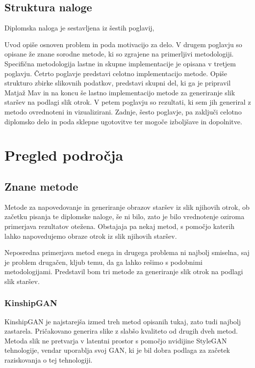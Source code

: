 \documentclass[a4paper,12pt,openright]{book}
\begin{document}
\section{Struktura naloge}
Diplomska naloga je sestavljena iz šestih poglavij,

Uvod opiše osnoven problem in poda motivacijo za delo. V drugem poglavju so opisane že znane sorodne metode, ki so zgrajene na primerljivi metodologiji. Specifična metodologija lastne in skupne implementacije je opisana v tretjem poglavju. Četrto poglavje predstavi celotno implementacijo metode. Opiše strukturo zbirke slikovnih podatkov, predstavi skupni del, ki ga je pripravil Matjaž Mav in na koncu še lastno implementacijo metode za generiranje slik staršev na podlagi slik otrok. V petem poglavju so rezultati, ki sem jih generiral z metodo ovrednoteni in vizualizirani. Zadnje, šesto poglavje, pa zaključi celotno diplomsko delo in poda sklepne ugotovitve ter mogoče izboljšave in dopolnitve.

\chapter{Pregled področja}

\section{Znane metode}
Metode za napovedovanje in generiranje obrazov staršev iz slik njihovih otrok, ob začetku pisanja te diplomske naloge, še ni bilo, zato je bilo vrednotenje oziroma primerjava rezultatov otežena.
Obstajaja pa nekaj metod, s pomočjo katerih lahko napovedujemo obraze otrok iz slik njihovih staršev. 

Neposredna primerjava metod enega in drugega problema ni najbolj smiselna, saj je problem drugačen, kljub temu, da ga lahko rešimo s podobnimi metodologijami.
Predstavil bom tri metode za generiranje slik otrok na podlagi slik staršev.

\subsection{KinshipGAN}
KinshipGAN \cite{zkan2018KinshipganSO} je najstarejša izmed treh metod opisanih tukaj, zato tudi najbolj zastarela. Pričakovano generira slike z slabšo kvaliteto od drugih dveh metod. Metoda slik ne pretvarja v latentni prostor s pomočjo nvidijine StyleGAN \cite{karras2019style} tehnologije, vendar uporablja svoj GAN, ki je bil dobra podlaga za začetek raziskovanja o tej tehnologiji. 
\end{document}
